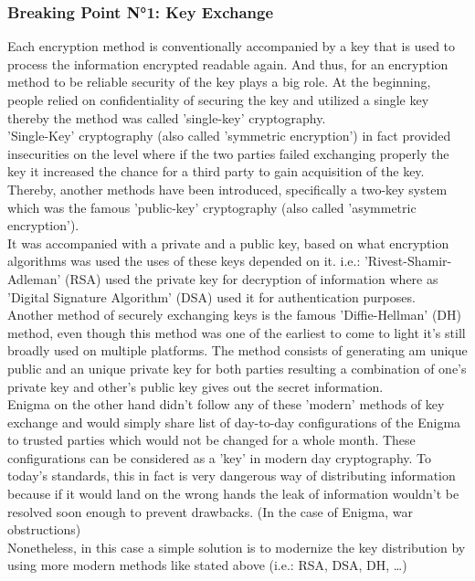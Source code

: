 \documentclass[conference,compsoc]{IEEEtran}
\begin{document}
\subsubsection{Breaking Point N°1: Key Exchange} Each encryption method is conventionally accompanied by a key that is used to process the information encrypted readable again. And thus, for an encryption method to be reliable security of the key plays a big role. At the beginning, people relied on confidentiality of securing the key and utilized a single key thereby the method was called 'single-key' cryptography.\\
'Single-Key' cryptography (also called 'symmetric encryption') in fact provided insecurities on the level where if the two parties failed exchanging properly the key it increased the chance for a third party to gain acquisition of the key.\\
Thereby, another methods have been introduced, specifically a two-key system which was the famous 'public-key' cryptography (also called 'asymmetric encryption').\\
It was accompanied with a private and a public key, based on what encryption algorithms was used the uses of these keys depended on it. i.e.: 'Rivest-Shamir-Adleman' (RSA) used the private key for decryption of information where as 'Digital Signature Algorithm' (DSA) used it for authentication purposes.\\
Another method of securely exchanging keys is the famous 'Diffie-Hellman' (DH) method, even though this method was one of the earliest to come to light it's still broadly used on multiple platforms. The method consists of generating am unique public and an unique private key for both parties resulting a combination of one's private key and other's public key gives out the secret information.\\
Enigma on the other hand didn't follow any of these 'modern' methods of key exchange and would simply share list of day-to-day configurations of the Enigma to trusted parties which would not be changed for a whole month. These configurations can be considered as a 'key' in modern day cryptography.
To today's standards, this in fact is very dangerous way of distributing information because if it would land on the wrong hands the leak of information wouldn't be resolved soon enough to prevent drawbacks. (In the case of Enigma, war obstructions)\\ 
Nonetheless, in this case a simple solution is to modernize the key distribution by using more modern methods like stated above (i.e.:  RSA, DSA, DH, \ldots)
\end{document}
